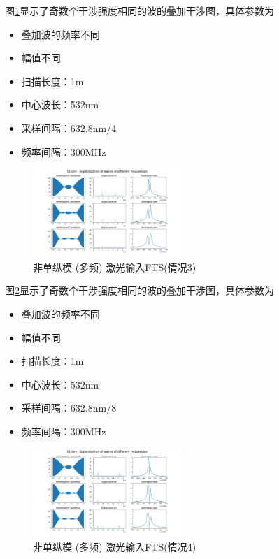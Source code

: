 \documentclass[conference]{IEEEtran}
\begin{document}
图\ref{pic12}显示了奇数个干涉强度相同的波的叠加干涉图，具体参数为
\begin{itemize}
    \item 叠加波的频率不同
    \item 幅值不同
    \item 扫描长度：1m
    \item 中心波长：532nm
    \item 采样间隔：632.8nm/4
    \item 频率间隔：300MHz
\end{itemize}
\begin{figure}[htbp]
    \centerline{\includegraphics[width=0.5\textwidth]{pic12.png}}
    \caption{非单纵模 (多频) 激光输入FTS(情况3)}
    \label{pic12}
\end{figure}

图\ref{pic13}显示了奇数个干涉强度相同的波的叠加干涉图，具体参数为
\begin{itemize}
    \item 叠加波的频率不同
    \item 幅值不同
    \item 扫描长度：1m
    \item 中心波长：532nm
    \item 采样间隔：632.8nm/8
    \item 频率间隔：300MHz
\end{itemize}
\begin{figure}[htbp]
    \centerline{\includegraphics[width=0.5\textwidth]{pic13.png}}
    \caption{非单纵模 (多频) 激光输入FTS(情况4)}
    \label{pic13}
\end{figure}
\end{document}
